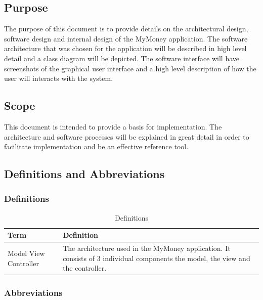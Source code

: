\documentclass[12pt]{article}
\begin{document}
\subsection{Purpose}
The purpose of this document is to provide details on the architectural design, software design and internal design of the MyMoney application. The software architecture that was chosen for the application will be described in high level detail and a class diagram will be depicted. The software interface will have screenshots of the graphical user interface and a high level description of how the user will interacts with the system.


\subsection{Scope}
This document is intended to provide a basis for implementation. The architecture and software processes will be explained in great detail in order to facilitate implementation and be an effective reference tool. 


\subsection{Definitions and Abbreviations}

\subsubsection{Definitions}
\begin{table}[H]
\caption{Definitions}
\begin{center}
\begin{tabular}{|p{3cm}|p{12cm}|}
\hline
Term & Definition \\
\hline\hline
Model View Controller & The architecture used in the MyMoney application. It consists of 3 individual components the model, the view and the controller.  \\
\hline

\end{tabular}
\end{center}
\end{table}

\subsubsection{Abbreviations}
\end{document}
